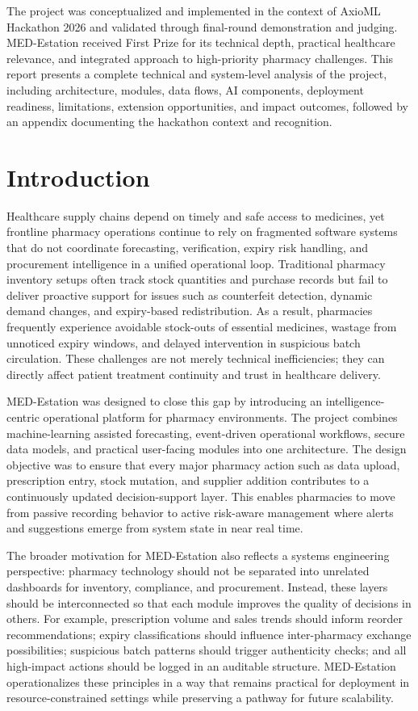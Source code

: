 \documentclass[12pt,a4paper]{report}
\begin{document}
The project was conceptualized and implemented in the context of AxioML Hackathon 2026 and validated through final-round demonstration and judging. MED-Estation received First Prize for its technical depth, practical healthcare relevance, and integrated approach to high-priority pharmacy challenges. This report presents a complete technical and system-level analysis of the project, including architecture, modules, data flows, AI components, deployment readiness, limitations, extension opportunities, and impact outcomes, followed by an appendix documenting the hackathon context and recognition.

\clearpage
{}

\chapter{Introduction}
Healthcare supply chains depend on timely and safe access to medicines, yet frontline pharmacy operations continue to rely on fragmented software systems that do not coordinate forecasting, verification, expiry risk handling, and procurement intelligence in a unified operational loop. Traditional pharmacy inventory setups often track stock quantities and purchase records but fail to deliver proactive support for issues such as counterfeit detection, dynamic demand changes, and expiry-based redistribution. As a result, pharmacies frequently experience avoidable stock-outs of essential medicines, wastage from unnoticed expiry windows, and delayed intervention in suspicious batch circulation. These challenges are not merely technical inefficiencies; they can directly affect patient treatment continuity and trust in healthcare delivery.

MED-Estation was designed to close this gap by introducing an intelligence-centric operational platform for pharmacy environments. The project combines machine-learning assisted forecasting, event-driven operational workflows, secure data models, and practical user-facing modules into one architecture. The design objective was to ensure that every major pharmacy action such as data upload, prescription entry, stock mutation, and supplier addition contributes to a continuously updated decision-support layer. This enables pharmacies to move from passive recording behavior to active risk-aware management where alerts and suggestions emerge from system state in near real time.

The broader motivation for MED-Estation also reflects a systems engineering perspective: pharmacy technology should not be separated into unrelated dashboards for inventory, compliance, and procurement. Instead, these layers should be interconnected so that each module improves the quality of decisions in others. For example, prescription volume and sales trends should inform reorder recommendations; expiry classifications should influence inter-pharmacy exchange possibilities; suspicious batch patterns should trigger authenticity checks; and all high-impact actions should be logged in an auditable structure. MED-Estation operationalizes these principles in a way that remains practical for deployment in resource-constrained settings while preserving a pathway for future scalability.
\end{document}
